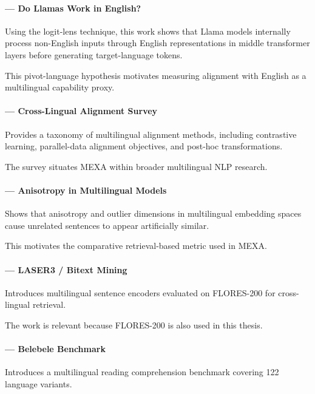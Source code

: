 \documentclass{article}
\begin{document}
\paragraph{\citet{wendler2024llamas} --- Do Llamas Work in English?}

Using the logit-lens technique, this work shows that Llama models
internally process non-English inputs through English representations
in middle transformer layers before generating target-language tokens.

This pivot-language hypothesis motivates measuring alignment with
English as a multilingual capability proxy.

\paragraph{\citet{hammerl2024survey} --- Cross-Lingual Alignment Survey}

Provides a taxonomy of multilingual alignment methods, including
contrastive learning, parallel-data alignment objectives,
and post-hoc transformations.

The survey situates MEXA within broader multilingual NLP research.

\paragraph{\citet{hammerl2023anisotropy} --- Anisotropy in Multilingual Models}

Shows that anisotropy and outlier dimensions in multilingual embedding
spaces cause unrelated sentences to appear artificially similar.

This motivates the comparative retrieval-based metric used in MEXA.

\paragraph{\citet{heffernan2022laser3} --- LASER3 / Bitext Mining}

Introduces multilingual sentence encoders evaluated on FLORES-200
for cross-lingual retrieval.

The work is relevant because FLORES-200 is also used in this thesis.

\paragraph{\citet{bandarkar2024belebele} --- Belebele Benchmark}

Introduces a multilingual reading comprehension benchmark
covering 122 language variants.
\end{document}
